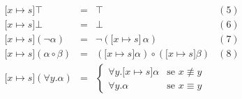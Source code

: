 \begin{Definition}[Substituição]
\[\begin{array}{lclc}
\lbrack x \mapsto s\rbrack \top & = & \top  & (5)\\
\lbrack x \mapsto s\rbrack \bot & = & \bot & (6) \\
\lbrack x \mapsto s\rbrack (\neg \alpha) & = & \neg (\lbrack x \mapsto
s\rbrack\,\alpha) & (7) \\
\lbrack x \mapsto s\rbrack (\alpha \circ \beta) & = & (\lbrack x
\mapsto s\rbrack\alpha) \circ (\lbrack x \mapsto s\rbrack \beta) & (8)\\
\lbrack x \mapsto s\rbrack (\forall y. \alpha) & = & \left\{
                                                                                       \begin{array}{ll}
                                                                                         \forall
                                                                                         y. \lbrack
                                                                                         x
                                                                                         \mapsto
                                                                                         s\rbrack
                                                                                         \alpha
                                                                                         &
                                                                                         \text{se
                                                                                         }x\not\equiv
                                                                                         y
                                                                                         \\
                                                                                         \forall
                                                                                         y. \alpha
                                                                                         &
                                                                                         \text{se
                                                                                         }x
                                                                                         \equiv y
                                                                                        \end{array}
                                                                                   \right. &

\end{array}\]
\end{Definition}
